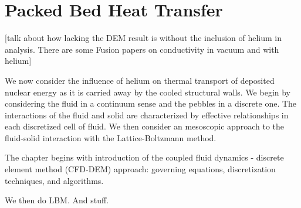 \chapter{Packed Bed Heat Transfer} \label{ch:heat-transfer}
[talk about how lacking the DEM result is without the inclusion of helium in analysis. There are some Fusion papers on conductivity in vacuum and with helium]

We now consider the influence of helium on thermal transport of deposited nuclear energy as it is carried away by the cooled structural walls. We begin by considering the fluid in a continuum sense and the pebbles in a discrete one. The interactions of the fluid and solid are characterized by effective relationships in each discretized cell of fluid. We then consider an mesoscopic approach to the fluid-solid interaction with the Lattice-Boltzmann method. 

The chapter begins with introduction of the coupled fluid dynamics - discrete element method (CFD-DEM) approach: governing equations, discretization techniques, and algorithms.

We then do LBM. And stuff.



%
